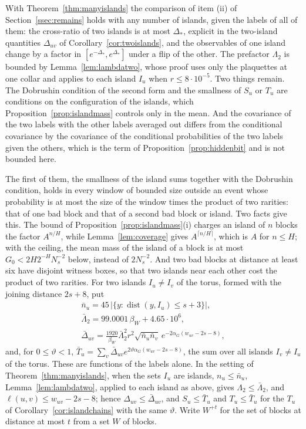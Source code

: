 \documentclass[11pt]{amsart}
\theoremstyle{definition}
\theoremstyle{remark}
\numberwithin{equation}{section}
\newcommand{\dist}{\operatorname{dist}}
\begin{document}
With Theorem~\ref{thm:manyislands} the comparison of item (ii) of
Section~\ref{ssec:remains} holds with any number of islands, given the labels
of all of them: the cross-ratio of two islands is at most $\varDelta_*$,
explicit in the two-island quantities $\varDelta_{uv}$ of
Corollary~\ref{cor:twoislands}, and the observables of one island change
by a factor in $[e^{-\varDelta_*},e^{\varDelta_*}]$ under a flip of the
other. The prefactor $\Lambda_2$ is bounded by Lemma~\ref{lem:lambdatwo},
whose proof uses only the plaquettes at one collar and applies to each
island $I_u$ when $r\le8\cdot10^{-5}$. Two things remain. The Dobrushin condition of the second form
and the smallness of $S_u$ or $T_u$ are conditions on the configuration of
the islands, which Proposition~\ref{prop:islandmass} controls only in the
mean. And the covariance of the two labels with the other labels averaged
out differs from the conditional covariance by the covariance of the
conditional probabilities of the two labels given the others, which is the
term of Proposition~\ref{prop:hiddenbit} and is not bounded here.

The first of them, the smallness of the island sums together with the
Dobrushin condition, holds in every window of bounded size
outside an event whose probability is at most the size of the window times
the product of two rarities: that of one bad block and that of a second bad
block or island. Two facts give this. The bound of
Proposition~\ref{prop:islandmass}(i) charges an island of $n$ blocks the
factor $A^{n/H}$, while Lemma~\ref{lem:coverage} gives $A^{\lceil n/H
\rceil}$, which is $A$ for $n\le H$; with the ceiling, the mean mass of the
island of a block is at most $G_0<2H2^{-H}N_s^{-2}$ below,
instead of $2N_s^{-2}$. And two bad
blocks at distance at least six have disjoint witness boxes, so that two
islands near each other cost the product of two rarities. For two islands
$I_u\ne I_v$ of the torus, formed with the joining distance $2s+8$, put
\begin{gather*}
\bar n_u=45\,\bigl\lvert\{y:\dist(y,I_u)\le s+3\}\bigr\rvert,\\
\bar\Lambda_2=99.0001\,\beta_W+4.65\cdot10^6,\\
\bar\varDelta_{uv}=\frac{1920}{\beta_W}\bar\Lambda_2^2r^2\sqrt{\bar n_u
\bar n_v}\,e^{-2\alpha_G(w_{uv}-2s-8)},
\end{gather*}
and, for $0\le\vartheta<1$, $\bar T_u=\sum_v\bar\varDelta_{uv}e^{2\vartheta
\alpha_G(w_{uv}-2s-8)}$, the sum over all islands $I_v\ne I_u$ of the
torus. These are functions of the labels alone. In the setting of
Theorem~\ref{thm:manyislands}, when the sets $I_u$ are islands,
$n_u\le\bar n_u$, Lemma~\ref{lem:lambdatwo}, applied to each island as
above, gives $\Lambda_2\le\bar\Lambda_2$, and $\ell(u,v)\le w_{uv}-2s-8$;
hence $\varDelta_{uv}\le\bar\varDelta_{uv}$, and $S_u\le\bar T_u$ and
$T_u\le\bar T_u$ for the $T_u$ of Corollary~\ref{cor:islandchains} with
the same $\vartheta$. Write $W^{+t}$ for the set of blocks at distance at
most $t$ from a set $W$ of blocks.
\end{document}

